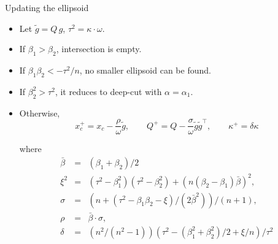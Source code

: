 \documentclass[10pt,ignorenonframetext,serif,onlymath]{beamer}
\begin{document}
\begin{frame}{Updating the ellipsoid}
\protect\hypertarget{updating-the-ellipsoid}{}

\begin{itemize}
\item
  Let \(\tilde{g} = Q\,g\), \(\tau^2 = \kappa\cdot\omega\).
\item
  If \(\beta_1 > \beta_2\), intersection is empty.
\item
  If \(\beta_1 \beta_2 < -\tau^2/n\), no smaller ellipsoid can be found.
\item
  If \(\beta_2^2 > \tau^2\), it reduces to deep-cut with
  \(\alpha = \alpha_1\).
\item
  Otherwise, \[x_c^+ = x_c - \frac{\rho}{\omega} \tilde{g}, \qquad
  Q^+ = Q - \frac{\sigma}{\omega} \tilde{g}\tilde{g}^\top, \qquad
  \kappa^+ =  \delta \kappa
   \]

  where \[\begin{array}{lll}
    \bar{\beta} &=& (\beta_1 + \beta_2)/2 \\
    \xi^2 &=& (\tau^2 - \beta_1^2)(\tau^2 - \beta_2^2) + (n(\beta_2 - \beta_1)\bar{\beta})^2, \\
    \sigma &=& (n + (\tau^2 - \beta_1\beta_2 - \xi)/(2\bar{\beta}^2)) / (n + 1), \\
    \rho &=& \bar{\beta}\cdot\sigma, \\
    \delta &=& (n^2/(n^2-1)) (\tau^2 - (\beta_1^2 + \beta_2^2)/2 + \xi/n) / \tau^2
   \end{array}\]
\end{itemize}

\end{frame}
\end{document}

